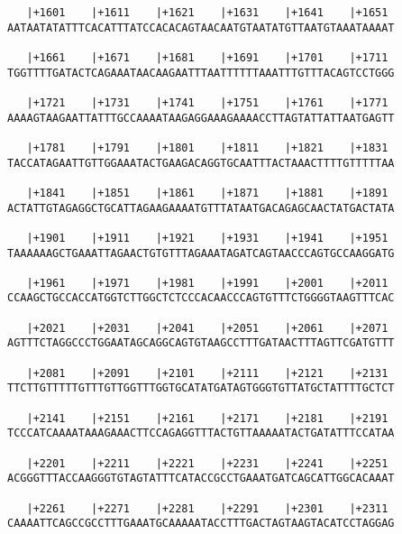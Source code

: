 \documentclass{article}
\begin{document}
\begin{Verbatim}
   |+1601    |+1611    |+1621    |+1631    |+1641    |+1651 
AATAATATATTTCACATTTATCCACACAGTAACAATGTAATATGTTAATGTAAATAAAAT
                                                            
   |+1661    |+1671    |+1681    |+1691    |+1701    |+1711 
TGGTTTTGATACTCAGAAATAACAAGAATTTAATTTTTTAAATTTGTTTACAGTCCTGGG
                                                            
   |+1721    |+1731    |+1741    |+1751    |+1761    |+1771 
AAAAGTAAGAATTATTTGCCAAAATAAGAGGAAAGAAAACCTTAGTATTATTAATGAGTT
                                                            
   |+1781    |+1791    |+1801    |+1811    |+1821    |+1831 
TACCATAGAATTGTTGGAAATACTGAAGACAGGTGCAATTTACTAAACTTTTGTTTTTAA
                                                            
   |+1841    |+1851    |+1861    |+1871    |+1881    |+1891 
ACTATTGTAGAGGCTGCATTAGAAGAAAATGTTTATAATGACAGAGCAACTATGACTATA
                                                            
   |+1901    |+1911    |+1921    |+1931    |+1941    |+1951 
TAAAAAAGCTGAAATTAGAACTGTGTTTAGAAATAGATCAGTAACCCAGTGCCAAGGATG
                                                            
   |+1961    |+1971    |+1981    |+1991    |+2001    |+2011 
CCAAGCTGCCACCATGGTCTTGGCTCTCCCACAACCCAGTGTTTCTGGGGTAAGTTTCAC
                                                            
   |+2021    |+2031    |+2041    |+2051    |+2061    |+2071 
AGTTTCTAGGCCCTGGAATAGCAGGCAGTGTAAGCCTTTGATAACTTTAGTTCGATGTTT
                                                            
   |+2081    |+2091    |+2101    |+2111    |+2121    |+2131 
TTCTTGTTTTTGTTTGTTGGTTTGGTGCATATGATAGTGGGTGTTATGCTATTTTGCTCT
                                                            
   |+2141    |+2151    |+2161    |+2171    |+2181    |+2191 
TCCCATCAAAATAAAGAAACTTCCAGAGGTTTACTGTTAAAAATACTGATATTTCCATAA
                                                            
   |+2201    |+2211    |+2221    |+2231    |+2241    |+2251 
ACGGGTTTACCAAGGGTGTAGTATTTCATACCGCCTGAAATGATCAGCATTGGCACAAAT
                                                            
   |+2261    |+2271    |+2281    |+2291    |+2301    |+2311 
CAAAATTCAGCCGCCTTTGAAATGCAAAAATACCTTTGACTAGTAAGTACATCCTAGGAG
                                                            

\end{Verbatim}
\end{document}
